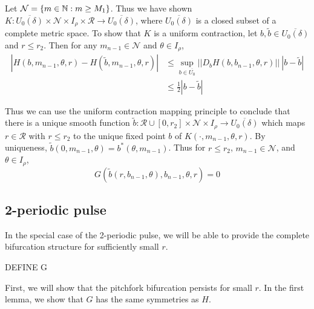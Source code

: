 \documentclass[thesis.tex]{subfiles}
\begin{document}
Let $\mathcal{N} = \{ m \in {\mathbb N} : m \geq M_1 \}$. Thus we have shown $K: \overline{U_0(\delta)} \times \mathcal{N} \times I_\rho \times \mathcal{R} \rightarrow \overline{U_0(\delta)}$, where $\overline{U_0(\delta)}$ is a closed subset of a complete metric space. To show that $K$ is a uniform contraction, let $b, \tilde{b} \in \overline{U_0(\delta)}$ and $r \leq r_2$. Then for any $m_{n-1} \in \mathcal{N}$ and $\theta \in I_\rho$,
\begin{align*}
|H(b, m_{n-1}, \theta, r) - H(\tilde{b}, m_{n-1}, \theta, r)| 
&\leq \sup_{b\in \overline{U_0}}||D_b H(b, b_{n-1}, \theta, r)||\:|b - \tilde{b}| \\
&\leq \frac{1}{2} |b - \tilde{b}|
\end{align*} 

Thus we can use the uniform contraction mapping principle to conclude that there is a unique smooth function $\tilde{b}: \mathcal{R} \cup [0, r_2] \times \mathcal{N} \times I_\rho \rightarrow \overline{U_0(\delta)}$ which maps $r \in \mathcal{R}$ with $r \leq r_2$ to the unique fixed point $b$ of $K(\cdot, m_{n-1}, \theta, r)$. By uniqueness, $\tilde{b}(0, m_{n-1}, \theta) = b^*(\theta, m_{n-1})$. Thus for $r \leq r_2$, $m_{n-1} \in \mathcal{N}$, and $\theta \in I_\rho$,
\[
G(\tilde{b}(r, b_{n-1}, \theta), b_{n-1}, \theta, r) = 0
\]

\subsection{2-periodic pulse}
In the special case of the 2-periodic pulse, we will be able to provide the complete bifurcation structure for sufficiently small $r$.

DEFINE G

First, we will show that the pitchfork bifurcation persists for small $r$. In the first lemma, we show that $G$ has the same symmetries as $H$.

\end{document}
